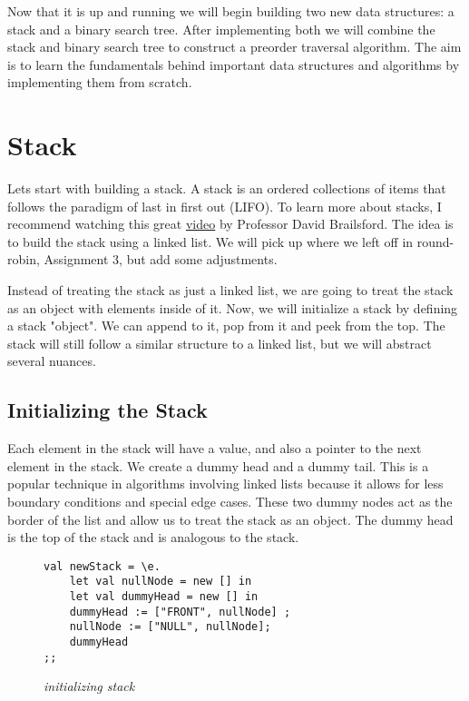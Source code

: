 \documentclass{article}
\begin{document}
\medskip\noindent
Now that it is up  and running we will begin building two new data structures: a stack and a binary search tree. After implementing both we will combine the stack and binary search tree to construct a preorder traversal algorithm. The aim is to learn the fundamentals behind important data structures and algorithms by implementing them from scratch. 

\section{Stack}

\medskip\noindent
Lets start with building a stack. A stack is an ordered collections of items that follows the paradigm of last in first out (LIFO). To learn more about stacks, I recommend watching this great \href{https://www.youtube.com/watch?v=7ha78yWRDlE}{video} by Professor David Brailsford. The idea is to build the stack using a linked list. We will pick up where we left off in round-robin, Assignment 3, but add some adjustments. 

\medskip\noindent
Instead of treating the stack as just a linked list, we are going to treat the stack as an object with elements inside of it. Now, we will initialize a stack by defining a stack "object". We can append to it, pop from it and peek from the top. The stack will still follow a similar structure to a linked list, but we will abstract several nuances. 

\subsection{Initializing the Stack}

\medskip\noindent
Each element in the stack will have a value, and also a pointer to the next element in the stack. We create a dummy head and a dummy tail. This is a popular technique in algorithms involving linked lists because it allows for less boundary conditions and special edge cases. These two dummy nodes act as the border of the list and allow us to treat the stack as an object. The dummy head is the top of the stack and is analogous to the stack.
\begin{figure}[H]
    \begin{lstlisting}
val newStack = \e.
    let val nullNode = new [] in
    let val dummyHead = new [] in
    dummyHead := ["FRONT", nullNode] ;
    nullNode := ["NULL", nullNode];
    dummyHead
;;
    \end{lstlisting}
    \caption{\textit{initializing stack}}
\end{figure}
\end{document}
